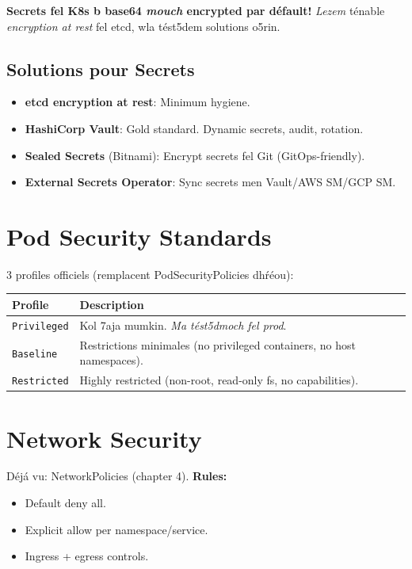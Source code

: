 \documentclass[11pt,a4paper]{book}
\newcommand{\tuni}[1]{\textit{\color{k8sdark}#1}}
\begin{document}
\begin{warnbox}
\textbf{Secrets fel K8s b base64 \tuni{mouch} encrypted par d\'efault!} \tuni{Lezem} t\'enable \tuni{encryption at rest} fel etcd, wla t\'est5dem solutions o5rin.
\end{warnbox}

\subsection{Solutions pour Secrets}

\begin{itemize}
  \item \textbf{etcd encryption at rest}: Minimum hygiene.
  \item \textbf{HashiCorp Vault}: Gold standard. Dynamic secrets, audit, rotation.
  \item \textbf{Sealed Secrets} (Bitnami): Encrypt secrets fel Git (GitOps-friendly).
  \item \textbf{External Secrets Operator}: Sync secrets men Vault/AWS SM/GCP SM.
\end{itemize}

\section{Pod Security Standards}

3 profiles officiels (remplacent PodSecurityPolicies dh\'r\'eou):

\begin{longtable}{L{3cm}L{8cm}}
\toprule
\textbf{Profile} & \textbf{Description} \\
\midrule
\texttt{Privileged} & Kol 7aja mumkin. \tuni{Ma t\'est5dmoch fel prod}. \\
\texttt{Baseline} & Restrictions minimales (no privileged containers, no host namespaces). \\
\texttt{Restricted} & Highly restricted (non-root, read-only fs, no capabilities). \\
\bottomrule
\end{longtable}

\section{Network Security}

D\'ej\'a vu: NetworkPolicies (chapter 4). \textbf{Rules:}
\begin{itemize}
  \item Default deny all.
  \item Explicit allow per namespace/service.
  \item Ingress + egress controls.
\end{itemize}
\end{document}
